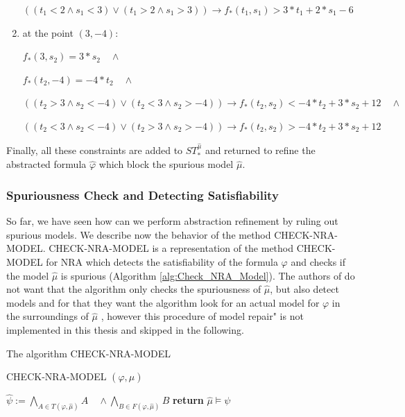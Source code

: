 \begin{example}
\begin{enumerate}
     $((t_{1} < 2 \wedge s_{1} < 3) \vee (t_{1} > 2 \wedge s_{1} > 3)) \to f_{\ast}(t_{1}, s_{1}) > 3 \ast t_{1} + 2 \ast s_{1} - 6$
    \item at the point $(3, -4)$: 
    
    $f_{\ast}(3, s_{2}) = 3 \ast s_{2} \quad \wedge$
    
    $f_{\ast}(t_{2}, -4) = -4 \ast t_{2} \quad \wedge$
    
    $((t_{2} > 3 \wedge s_{2} < -4) \vee (t_{2} < 3 \wedge s_{2} > -4)) \to f_{\ast}(t_{2}, s_{2}) < -4 \ast t_{2} + 3 \ast s_{2} + 12 \quad \wedge$
    
     $((t_{2} < 3 \wedge s_{2} < -4) \vee (t_{2} > 3 \wedge s_{2} > -4)) \to f_{\ast}(t_{2}, s_{2}) > -4 \ast t_{2} + 3 \ast s_{2} + 12$
    \end{enumerate}
    
    Finally, all these constraints are added to $ST_{\ast}^{\hat{\mu}}$ and returned to refine the abstracted formula $\hat{\varphi}$ which block the spurious model $\hat{\mu}$.
\end{example}

\subsubsection{Spuriousness Check and Detecting Satisfiability}
\label{subsubsec:Spuriousness_Check_ and_Detecting_Satisfiability}
So far, we have seen how can we perform abstraction refinement by ruling out spurious models.
We describe now the behavior of the method CHECK-NRA-MODEL.
CHECK-NRA-MODEL is a representation of the method CHECK-MODEL for NRA which detects the satisfiability of the formula $\varphi$ and checks if the model $\hat{\mu}$ is spurious (Algorithm \ref{alg:Check_NRA_Model}).
The authors of \cite{Cimatti:2018:ILS:3274693.3230639} do not want that the algorithm only checks the spuriousness of $\hat{\mu}$, but also detect models and for that they want the algorithm look for an actual model for $\varphi$ in the surroundings of $\hat{\mu}$ \cite{Cimatti:2018:ILS:3274693.3230639}, however this procedure of model repair" is not implemented in this thesis and skipped in the following.\newline

\begin{algorithm}
\caption{The algorithm CHECK-NRA-MODEL \cite{Cimatti:2018:ILS:3274693.3230639}} 
\label{alg:Check_NRA_Model}
CHECK-NRA-MODEL $(\varphi, \hat{\mu})$
\begin{algorithmic}[1]
\State $\hat{\psi} := \bigwedge\limits_{A \in T(\varphi, \hat{\mu})} A \quad \wedge \bigwedge\limits_{B \in F(\varphi, \hat{\mu})} B$
\State \textbf{return} $\hat{\mu} \models \psi$
\end{algorithmic}
\end{algorithm}

